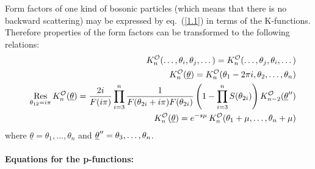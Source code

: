 \documentclass[a4paper,a4paper]{article}
\begin{document}
Form factors of one kind of bosonic particles (which means that there is no
backward scattering) may be expressed by eq.~(\ref{1.1}) in terms of the
K-functions. Therefore properties of the form factors can be transformed to
the following relations: 
\begin{eqnarray}
&&K_{n}^{\mathcal{O}}(\dots ,\theta _{i},\theta _{j},\dots )=K_{n}^{\mathcal{%
O}}(\dots ,\theta _{j},\theta _{i},\dots )  \label{pk1} \\
&&K_{n}^{\mathcal{O}}(\underline{\theta })=K_{n}^{\mathcal{O}}(\theta
_{1}-2\pi i,\theta _{2},\dots ,\theta _{n})  \label{pk2} \\
&&\mathop{\rm Res}_{\theta _{12}=i\pi }K_{n}^{\mathcal{O}}(\underline{\theta 
})=\frac{2i}{F(i\pi )}\prod_{i=3}^{n}\frac{1}{F(\theta _{2i}+i\pi )F(\theta
_{2i})}\left( 1-\prod_{i=3}^{n}S(\theta _{2i})\right) K_{n-2}^{\mathcal{O}}(%
\underline{\theta }^{\prime \prime })  \label{pk3} \\
&&K_{n}^{\mathcal{O}}(\underline{\theta })=e^{-s\mu }\,K_{n}^{\mathcal{O}%
}(\theta _{1}+\mu ,\dots ,\theta _{n}+\mu )  \label{pk5}
\end{eqnarray}
where $\underline{\theta }=\theta _{1},\dots ,\theta _{n}$ and $\underline{%
\theta }^{\prime \prime }=\theta _{3},\dots ,\theta _{n}$.

\paragraph{Equations for the p-functions:}
\end{document}
